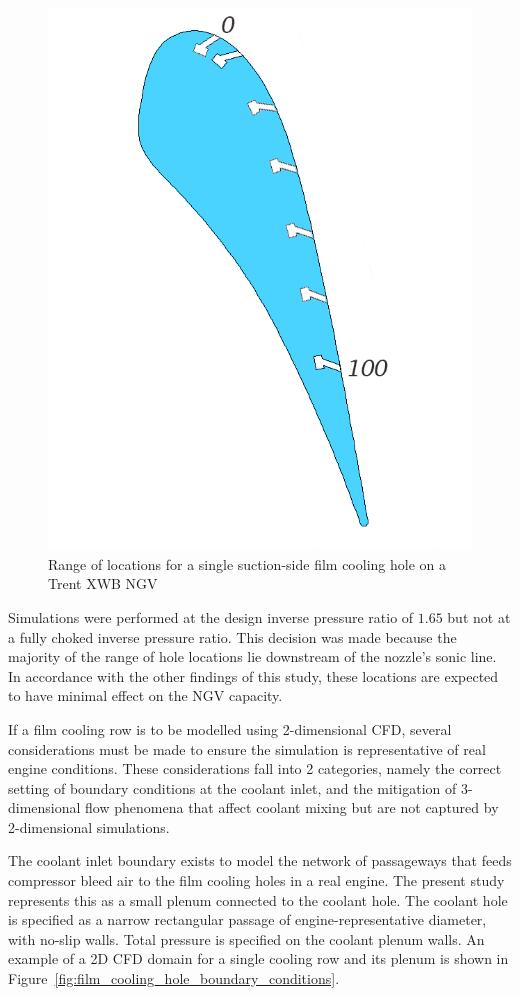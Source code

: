\documentclass[a4paper, 11pt, oneside]{report}
\begin{document}
\begin{figure}[H]
	\centering
	\includegraphics[width=.45\textwidth]{figs/SCH_hole_range.png}
	\caption{Range of locations for a single suction-side film cooling hole on a Trent XWB NGV}
    \label{fig:SCH_hole_range}
\end{figure}

Simulations were performed at the design inverse pressure ratio of $1.65$ but not at a fully choked inverse pressure ratio. This decision was made because the majority of the range of hole locations lie downstream of the nozzle's sonic line. In accordance with the other findings of this study, these locations are expected to have minimal effect on the NGV capacity.

If a film cooling row is to be modelled using 2-dimensional CFD, several considerations must be made to ensure the simulation is representative of real engine conditions. These considerations fall into 2 categories, namely the correct setting of boundary conditions at the coolant inlet, and the mitigation of 3-dimensional flow phenomena that affect coolant mixing but are not captured by 2-dimensional simulations. %

The coolant inlet boundary exists to model the network of passageways that feeds compressor bleed air to the film cooling holes in a real engine. The present study represents this as a small plenum connected to the coolant hole. The coolant hole is specified as a narrow rectangular passage of engine-representative diameter, with no-slip walls. Total pressure is specified on the coolant plenum walls. An example of a 2D CFD domain for a single cooling row and its plenum is shown in Figure~\ref{fig:film_cooling_hole_boundary_conditions}.
\end{document}
